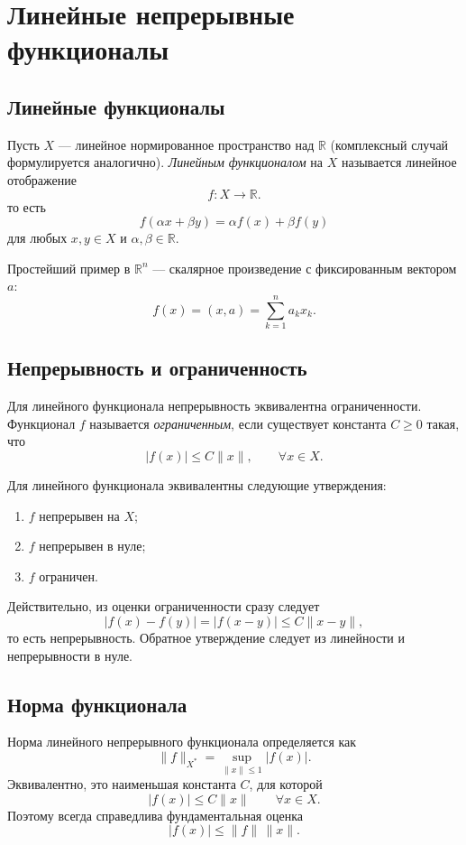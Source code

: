 \section{Линейные непрерывные функционалы}
\label{sec:continuous-linear-functionals}

\subsection{Линейные функционалы}

Пусть $X$ --- линейное нормированное пространство над $\mathbb R$
(комплексный случай формулируется аналогично). \emph{Линейным функционалом} на $X$
называется линейное отображение
\[
    f\colon X\to\mathbb R.
\]
то есть
\[
    f(\alpha x+\beta y)=\alpha f(x)+\beta f(y)
\]
для любых $x,y\in X$ и $\alpha,\beta\in\mathbb R$.

Простейший пример в $\mathbb R^n$ --- скалярное произведение с фиксированным
вектором $a$:
\[
    f(x)=(x,a)=\sum_{k=1}^n a_kx_k.
\]

\subsection{Непрерывность и ограниченность}

Для линейного функционала непрерывность эквивалентна ограниченности. Функционал
$f$ называется \emph{ограниченным}, если существует константа $C\geq0$ такая,
что
\[
    |f(x)|\leq C\|x\|,
    \qquad \forall x\in X.
\]

Для линейного функционала эквивалентны следующие утверждения:
\begin{enumerate}
    \item $f$ непрерывен на $X$;
    \item $f$ непрерывен в нуле;
    \item $f$ ограничен.
\end{enumerate}
Действительно, из оценки ограниченности сразу следует
\[
    |f(x)-f(y)|=|f(x-y)|\leq C\|x-y\|,
\]
то есть непрерывность. Обратное утверждение следует из линейности и
непрерывности в нуле.

\subsection{Норма функционала}

Норма линейного непрерывного функционала определяется как
\[
    \|f\|_{X^*}
    =\sup_{\|x\|\leq1}|f(x)|.
\]
Эквивалентно, это наименьшая константа $C$, для которой
\[
    |f(x)|\leq C\|x\|\qquad\forall x\in X.
\]
Поэтому всегда справедлива фундаментальная оценка
\[
    |f(x)|\leq\|f\|\,\|x\|.
\]

